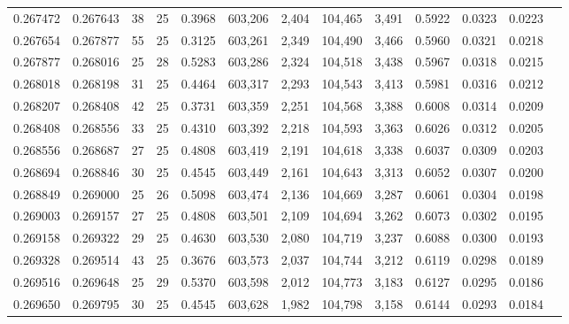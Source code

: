 \begin{tabular}{rrrrrrrrrrrrr}
0.267472 & 0.267643 &    38 &  25 &                                     0.3968 & 603,206 &   2,404 & 104,465 &   3,491 & 0.5922 & 0.0323 & 0.0223 \\
0.267654 & 0.267877 &    55 &  25 &                                     0.3125 & 603,261 &   2,349 & 104,490 &   3,466 & 0.5960 & 0.0321 & 0.0218 \\
0.267877 & 0.268016 &    25 &  28 &                                     0.5283 & 603,286 &   2,324 & 104,518 &   3,438 & 0.5967 & 0.0318 & 0.0215 \\
0.268018 & 0.268198 &    31 &  25 &                                     0.4464 & 603,317 &   2,293 & 104,543 &   3,413 & 0.5981 & 0.0316 & 0.0212 \\
0.268207 & 0.268408 &    42 &  25 &                                     0.3731 & 603,359 &   2,251 & 104,568 &   3,388 & 0.6008 & 0.0314 & 0.0209 \\
0.268408 & 0.268556 &    33 &  25 &                                     0.4310 & 603,392 &   2,218 & 104,593 &   3,363 & 0.6026 & 0.0312 & 0.0205 \\
0.268556 & 0.268687 &    27 &  25 &                                     0.4808 & 603,419 &   2,191 & 104,618 &   3,338 & 0.6037 & 0.0309 & 0.0203 \\
0.268694 & 0.268846 &    30 &  25 &                                     0.4545 & 603,449 &   2,161 & 104,643 &   3,313 & 0.6052 & 0.0307 & 0.0200 \\
0.268849 & 0.269000 &    25 &  26 &                                     0.5098 & 603,474 &   2,136 & 104,669 &   3,287 & 0.6061 & 0.0304 & 0.0198 \\
0.269003 & 0.269157 &    27 &  25 &                                     0.4808 & 603,501 &   2,109 & 104,694 &   3,262 & 0.6073 & 0.0302 & 0.0195 \\
0.269158 & 0.269322 &    29 &  25 &                                     0.4630 & 603,530 &   2,080 & 104,719 &   3,237 & 0.6088 & 0.0300 & 0.0193 \\
0.269328 & 0.269514 &    43 &  25 &                                     0.3676 & 603,573 &   2,037 & 104,744 &   3,212 & 0.6119 & 0.0298 & 0.0189 \\
0.269516 & 0.269648 &    25 &  29 &                                     0.5370 & 603,598 &   2,012 & 104,773 &   3,183 & 0.6127 & 0.0295 & 0.0186 \\
0.269650 & 0.269795 &    30 &  25 &                                     0.4545 & 603,628 &   1,982 & 104,798 &   3,158 & 0.6144 & 0.0293 & 0.0184 \\

\end{tabular}
